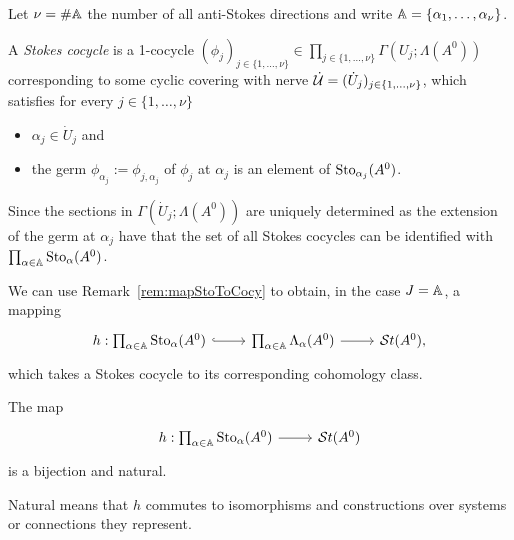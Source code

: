 \begin{defn}\label{defn:stokesCocycle}
  Let $\nu=\#\mathbb{A}$ the number of all anti-Stokes directions and write
  $\mathbb{A}=\{\alpha_1,\dots,\alpha_\nu\}$.

  A \emph{Stokes cocycle} is a 1-cocycle $(\phi_j)_{j\in\{1,\dots,\nu\}}\in
  \prod_{j\in\{1,\dots,\nu\}}\Gamma(U_j;\Lambda(A^0))$ corresponding to some
  cyclic covering with nerve $\dot{\mathcal{U}}=(\dot U_j)_{j\in\{1,\dots,\nu\}}$,
  which satisfies for every $j\in\{1,\dots,\nu\}$
  \begin{itemize}
    \item $\alpha_j\in\dot U_j$ and
    \item the germ $\phi_{\alpha_j}:=\phi_{j,\alpha_j}$ of $\phi_j$ at
      $\alpha_j$ is an element of $\operatorname{Sto}_{\alpha_j}(A^0)$.
  \end{itemize}
  \begin{s-rem}
    Since the sections in $\Gamma(\dot U_j;\Lambda(A^0))$ are uniquely
    determined as the extension of the germ at $\alpha_j$ have that the set of
    all Stokes cocycles can be identified with
    $\prod_{\alpha\in\mathbb{A}}\operatorname{Sto}_\alpha(A^0)$.
  \end{s-rem}
\end{defn}
We can use Remark~\ref{rem:mapStoToCocy} to obtain, in the case $J=\mathbb{A}$, a
mapping
\[ \begin{tikzcd}
    h:\prod_{\alpha\in\A}\Sto_\alpha(A^0)
    \rar[hook]&
    \prod_{\alpha\in\A}\Lambda_\alpha(A^0)
    \rar&
    \St(A^0),
\end{tikzcd} \]
which takes a Stokes cocycle to its corresponding cohomology class.
\begin{center}
  \begin{minipage}[t]{0.8\textwidth}
    \begin{tthm}\label{thm:mainThm2}
      The map
      \[ \begin{tikzcd}
          h:\prod_{\alpha\in\A}\Sto_\alpha(A^0) \rar& \St(A^0)
      \end{tikzcd} \]
      is a bijection and natural.
      \begin{s-rem}
        Natural means that $h$ commutes to isomorphisms and constructions over
        systems or connections they represent.
      \end{s-rem}
    \end{tthm}
  \end{minipage}
\end{center}
